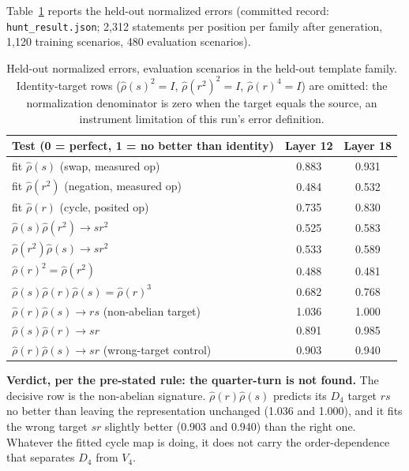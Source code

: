 \documentclass[11pt]{article}
\begin{document}
Table~\ref{tab:results} reports the held-out normalized errors (committed record:
\texttt{hunt\_result.json}; 2{,}312 statements per position per family after generation,
1{,}120 training scenarios, 480 evaluation scenarios).

\begin{table}[t]
\centering
\small
\begin{tabular}{lcc}
\toprule
Test (0 = perfect, 1 = no better than identity) & Layer 12 & Layer 18 \\
\midrule
fit $\hat\rho(s)$ (swap, measured op)        & 0.883 & 0.931 \\
fit $\hat\rho(r^2)$ (negation, measured op)  & 0.484 & 0.532 \\
fit $\hat\rho(r)$ (cycle, posited op)        & 0.735 & 0.830 \\
$\hat\rho(s)\hat\rho(r^2) \to sr^2$          & 0.525 & 0.583 \\
$\hat\rho(r^2)\hat\rho(s) \to sr^2$          & 0.533 & 0.589 \\
$\hat\rho(r)^2 = \hat\rho(r^2)$              & 0.488 & 0.481 \\
$\hat\rho(s)\hat\rho(r)\hat\rho(s) = \hat\rho(r)^3$ & 0.682 & 0.768 \\
$\hat\rho(r)\hat\rho(s) \to rs$ (non-abelian target) & 1.036 & 1.000 \\
$\hat\rho(s)\hat\rho(r) \to sr$              & 0.891 & 0.985 \\
$\hat\rho(r)\hat\rho(s) \to sr$ (wrong-target control) & 0.903 & 0.940 \\
\bottomrule
\end{tabular}
\caption{Held-out normalized errors, evaluation scenarios in the held-out template
family. Identity-target rows ($\hat\rho(s)^2 = I$, $\hat\rho(r^2)^2 = I$,
$\hat\rho(r)^4 = I$) are omitted: the normalization denominator is zero when the target
equals the source, an instrument limitation of this run's error definition.}
\label{tab:results}
\end{table}

\textbf{Verdict, per the pre-stated rule: the quarter-turn is not found.} The decisive
row is the non-abelian signature. $\hat\rho(r)\hat\rho(s)$ predicts its $D_4$ target
$rs$ no better than leaving the representation unchanged (1.036 and 1.000), and it fits
the wrong target $sr$ slightly better (0.903 and 0.940) than the right one. Whatever the
fitted cycle map is doing, it does not carry the order-dependence that separates $D_4$
from $V_4$.
\end{document}
